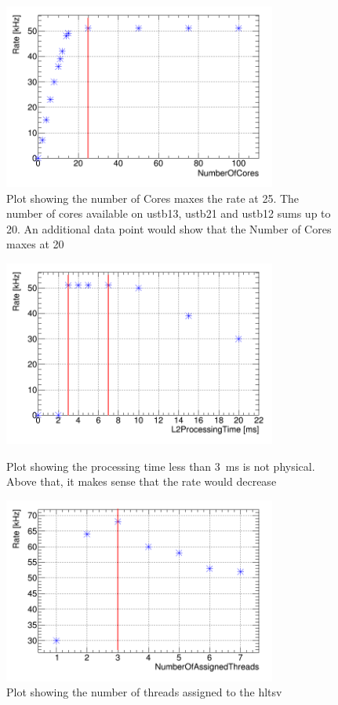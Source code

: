 \begin{figure}[!h]
\centering
  \includegraphics[width=0.8\textwidth]{figures/dcmVsRate.png}
	\caption{Plot showing the number of Cores maxes the rate at 25. The number of cores 
available on ustb13, ustb21 and ustb12 sums up to 20. An additional data point would show that 
the Number of Cores maxes at 20 }
  \label{para_plotsA}
\end{figure}

\begin{figure}[!h]
\centering
  \includegraphics[width=0.8\textwidth]{figures/l2pVsRate.png}\\
	\caption{Plot showing the processing time less than 3\ ms is 
not physical. Above that, it makes sense that the rate would decrease 
}
  \label{para_plotsB}
\end{figure} 

\begin{figure}[!h]
\centering
  \includegraphics[width=0.8\textwidth]{figures/threads.png}
	\caption{Plot showing the number of threads assigned to the \acrshort{hltsv}}
  \label{para_plotsC}
\end{figure}

